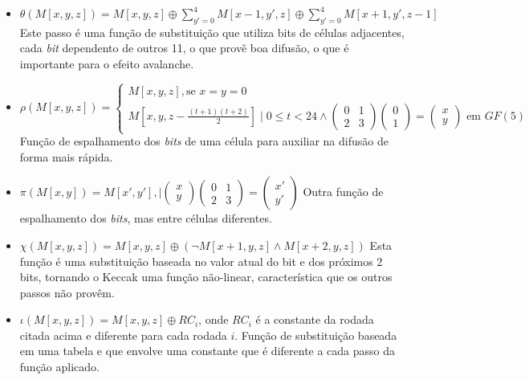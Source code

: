 \begin{itemize}
    \setlength\itemsep{1em}

    \item $\theta(M[x, y, z]) = M[x, y, z] \oplus \sum\limits_{y'=0}^{4}M[x-1, y', z] \oplus \sum\limits_{y'=0}^{4}M[x+1, y', z-1]$ \newline
        Este passo é uma função de substituição que utiliza bits de células adjacentes, cada \textit{bit} dependento de outros 11, o que provê boa difusão, o que é importante para o efeito avalanche.

    \item $\rho(M[x, y, z]) = \begin{cases}
            M[x, y, z], \mbox{se } x=y=0 \\
            M[x, y, z - \frac{(t+1)(t+2)}{2}] \mid 0 \leq t < 24 \land \begin{pmatrix}0 & 1 \\ 2 & 3\end{pmatrix} \begin{pmatrix}0 \\ 1\end{pmatrix} = \begin{pmatrix}x \\ y\end{pmatrix}\mbox{ em } GF(5)
        \end{cases}$ \newline
        Função de espalhamento dos \textit{bits} de uma célula para auxiliar na difusão de forma mais rápida.

    \item $\pi(M[x, y]) = M[x', y'], \mid \begin{pmatrix}x \\ y\end{pmatrix}\begin{pmatrix}0 & 1 \\ 2 & 3\end{pmatrix} = \begin{pmatrix}x' \\ y'\end{pmatrix}$ \newline
        Outra função de espalhamento dos \textit{bits}, mas entre células diferentes.

    \item $\chi(M[x, y, z]) = M[x, y, z] \oplus (\neg{M}[x+1, y, z] \land M[x+2, y, z])$ \newline
        Esta função é uma substituição baseada no valor atual do bit e dos próximos 2 bits, tornando o Keccak uma função não-linear, característica que os outros passos não provêm.

    \item $\iota(M[x, y, z]) = M[x, y, z] \oplus RC_{i}$, onde $RC_{i}$ é a constante da rodada citada acima e diferente para cada rodada $i$. \newline
        Função de substituição baseada em uma tabela e que envolve uma constante que é diferente a cada passo da função aplicado.
\end{itemize}

